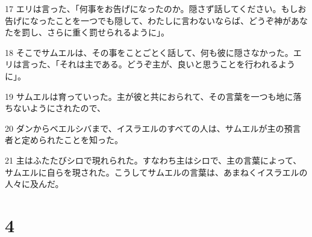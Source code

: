 \par 17 エリは言った、「何事をお告げになったのか。隠さず話してください。もしお告げになったことを一つでも隠して、わたしに言わないならば、どうぞ神があなたを罰し、さらに重く罰せられるように」。
\par 18 そこでサムエルは、その事をことごとく話して、何も彼に隠さなかった。エリは言った、「それは主である。どうぞ主が、良いと思うことを行われるように」。
\par 19 サムエルは育っていった。主が彼と共におられて、その言葉を一つも地に落ちないようにされたので、
\par 20 ダンからベエルシバまで、イスラエルのすべての人は、サムエルが主の預言者と定められたことを知った。
\par 21 主はふたたびシロで現れられた。すなわち主はシロで、主の言葉によって、サムエルに自らを現された。こうしてサムエルの言葉は、あまねくイスラエルの人々に及んだ。

\chapter{4}

